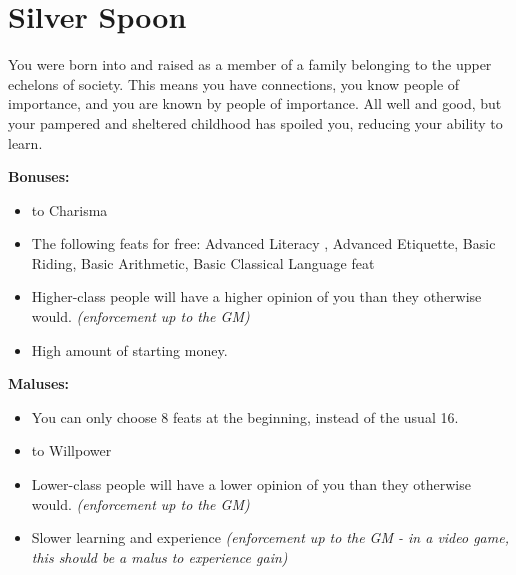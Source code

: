 \section{Silver Spoon}
You were born into and raised as a member of a family belonging to the upper echelons of society. This means you have connections, you know people of importance, and you are known by people of importance. All well and good, but your pampered and sheltered childhood has spoiled you, reducing your ability to learn.


\textbf{Bonuses:}
\begin{itemize}
	\item {} to Charisma
	\item The following feats for free: Advanced Literacy , Advanced Etiquette, Basic Riding, Basic Arithmetic, Basic Classical Language feat 
	\item Higher-class people will have a higher opinion of you than they otherwise would. \textit{(enforcement up to the GM)}
	\item High amount of starting money.
\end{itemize}


\textbf{Maluses:}
\begin{itemize}
	\item You can only choose 8 feats at the beginning, instead of the usual 16.
	\item {} to Willpower
	\item Lower-class people will have a lower opinion of you than they otherwise would. \textit{(enforcement up to the GM)}
	\item Slower learning and experience \textit{(enforcement up to the GM - in a video game, this should be a malus to experience gain)}
\end{itemize}
